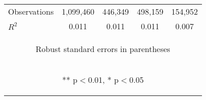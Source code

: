 \documentclass[]{article}
\begin{document}
\begin{center}
\begin{tabular}{lcccc}
Observations & 1,099,460 & 446,349 & 498,159 & 154,952 \\
 $R^2$ & 0.011 & 0.011 & 0.011 & 0.007 \\ \hline
\multicolumn{5}{c}{\begin{footnotesize} Robust standard errors in parentheses\end{footnotesize}} \\
\multicolumn{5}{c}{\begin{footnotesize} ** p$<$0.01, * p$<$0.05\end{footnotesize}} \\
\end{tabular}
\end{center}
\end{document}
